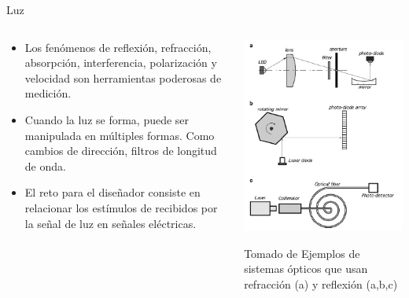\documentclass[aspectratio=169]{beamer}
\begin{document}
\begin{frame}{Luz}
\begin{columns}[c, onlytextwidth]
        \begin{column}{0.55\textwidth}
            \begin{itemize}
                \item Los fenómenos de reflexión, refracción, absorpción, interferencia, polarización y velocidad son herramientas poderosas de medición. 
                \item  Cuando la luz se forma, puede ser manipulada en múltiples formas. Como cambios de dirección, filtros de longitud de onda.
                \item El reto para el diseñador consiste en relacionar los estímulos de recibidos por la señal de luz en señales eléctricas.
            \end{itemize}
        \end{column}
        \begin{column}{0.45\textwidth}
            \centering
            \includegraphics[width = 0.8\linewidth]{fig/Optica/UsosRefracccion_Radiacion.PNG}
            
            \tiny{Tomado de \cite{Fraden_2016}}
            \tiny{Ejemplos de sistemas ópticos que usan refracción (a) y reflexión (a,b,c)}
            
        \end{column}
    \end{columns}
\end{frame}
\end{document}
